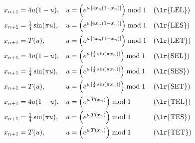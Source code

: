 \documentclass[preview,border=4pt]{standalone}
\begin{document}
\begin{align}
x_{n+1} &= 4u(1-u), & u &= \left(e^{\mu\, [4x_n(1-x_n)]}\right) \bmod 1 & &\mathrm{(\lr{LEL})} \\
x_{n+1} &= \tfrac{1}{4}\sin(\pi u), & u &= \left(e^{\mu\, [4x_n(1-x_n)]}\right) \bmod 1 & &\mathrm{(\lr{LES})} \\
x_{n+1} &= T(u), & u &= \left(e^{\mu\, [4x_n(1-x_n)]}\right) \bmod 1 & &\mathrm{(\lr{LET})} \\
x_{n+1} &= 4u(1-u), & u &= \left(e^{\mu\, [\frac{1}{4}\sin(\pi x_n)]}\right) \bmod 1 & &\mathrm{(\lr{SEL})} \\
x_{n+1} &= \tfrac{1}{4}\sin(\pi u), & u &= \left(e^{\mu\, [\frac{1}{4}\sin(\pi x_n)]}\right) \bmod 1 & &\mathrm{(\lr{SES})} \\
x_{n+1} &= T(u), & u &= \left(e^{\mu\, [\frac{1}{4}\sin(\pi x_n)]}\right) \bmod 1 & &\mathrm{(\lr{SET})} \\
x_{n+1} &= 4u(1-u), & u &= \left(e^{\mu\, T(x_n)}\right) \bmod 1 & &\mathrm{(\lr{TEL})} \\
x_{n+1} &= \tfrac{1}{4}\sin(\pi u), & u &= \left(e^{\mu\, T(x_n)}\right) \bmod 1 & &\mathrm{(\lr{TES})} \\
x_{n+1} &= T(u), & u &= \left(e^{\mu\, T(x_n)}\right) \bmod 1 & &\mathrm{(\lr{TET})} 
\end{align}
\end{document}
